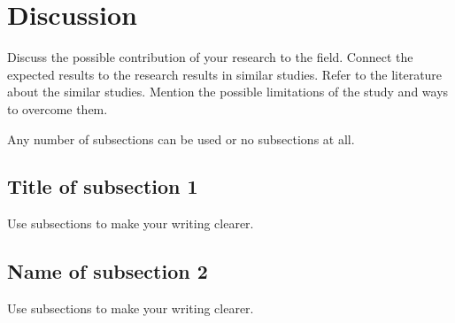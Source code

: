 \documentclass[oneside,final,12pt,a4paper]{extreport}
\begin{document}
\section{Discussion}
Discuss the possible contribution of your research to the field. Connect the expected results to the research results in similar studies. Refer to the literature about the similar studies. Mention the possible limitations of the study and ways to overcome them.

Any number of subsections can be used or no subsections at all.
\subsection{Title of subsection 1}
Use subsections to make your writing clearer.
\subsection{Name of subsection 2}
Use subsections to make your writing clearer.
\newpage
\printbibliography[heading=bibintoc,title={References}]
\end{document}
